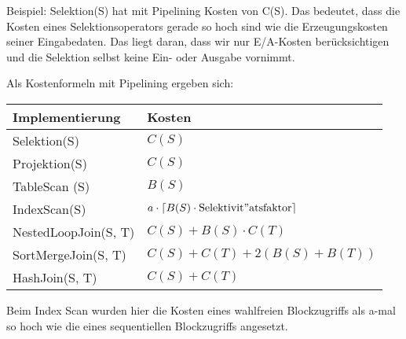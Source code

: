 \begin{enumerate}[a)]
\begin{solution}
		Beispiel: Selektion(S) hat mit Pipelining Kosten von C(S). Das bedeutet, dass die Kosten eines Selektionsoperators gerade so hoch sind wie die Erzeugungskosten seiner Eingabedaten. Das liegt daran, dass wir nur E/A-Kosten berücksichtigen und die Selektion selbst keine Ein- oder Ausgabe vornimmt.

		Als Kostenformeln mit Pipelining ergeben sich:

		\begin{tabular}{l l}
			\hline
			\textbf{Implementierung} 	& \textbf{Kosten}\\
			\hline
			Selektion(S)						& $C(S)$\\
			\hline
			Projektion(S)						& $C(S)$\\
			\hline
			TableScan	(S)							& $B(S)$\\
			\hline
			IndexScan(S)							& $a \cdot \left \lceil{ B(S) \cdot \mathrm{Selektivit"atsfaktor} }\right \rceil $\\
			\hline
			NestedLoopJoin(S, T)			& $C(S) + B(S) \cdot C(T)$\\
			\hline
			SortMergeJoin(S, T)				& $C(S) + C(T) + 2 (B(S) + B(T))$\\
			\hline
			HashJoin(S, T) 						& $C(S) + C(T)$\\
			\hline
		\end{tabular}

		Beim Index Scan wurden hier die Kosten eines wahlfreien Blockzugriffs als a-mal so hoch wie die eines sequentiellen Blockzugriffs angesetzt.
	\end{solution}

\end{enumerate}
